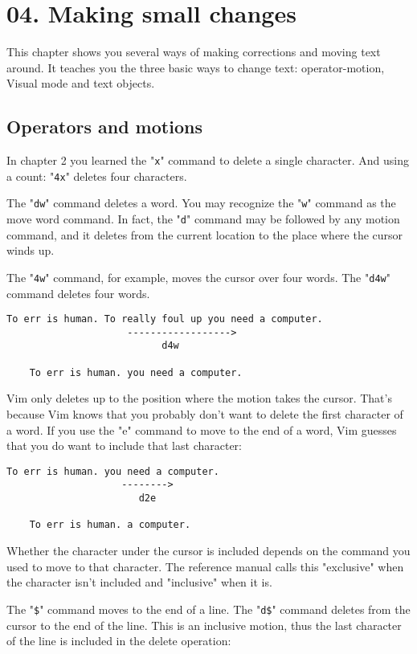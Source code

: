\section{04. Making small changes}
This chapter shows you several ways of making corrections and moving text
around.  It teaches you the three basic ways to change text: operator-motion,
Visual mode and text objects.
\subsection{Operators and motions}

In chapter 2 you learned the "\verb!x!" command to delete a single character.
And using a count: "\verb!4x!" deletes four characters.

The "\verb!dw!" command deletes a word.
You may recognize the "\verb!w!" command as the move word command.
In fact, the "\verb!d!" command may be followed by any motion command, and it deletes from the current location to the place where the cursor winds up.

The "\verb!4w!" command, for example, moves the cursor over four words.
The "\verb!d4w!" command deletes four words.

\begin{Verbatim}[samepage=true]
    To err is human. To really foul up you need a computer. 
                     ------------------>
                           d4w

    To err is human. you need a computer. 
\end{Verbatim}

Vim only deletes up to the position where the motion takes the cursor.
That's because Vim knows that you probably don't want to delete the first character of a word.
If you use the "e" command to move to the end of a word, Vim guesses that you do want to include that last character:

\begin{Verbatim}[samepage=true]
    To err is human. you need a computer. 
                    -------->
                       d2e

    To err is human. a computer. 
\end{Verbatim}

Whether the character under the cursor is included depends on the command you used to move to that character.
The reference manual calls this "exclusive" when the character isn't included and "inclusive" when it is.

The "\verb!$!" command moves to the end of a line.
The "\verb!d$!" command deletes from the cursor to the end of the line.
This is an inclusive motion, thus the last character of the line is included in the delete operation:

